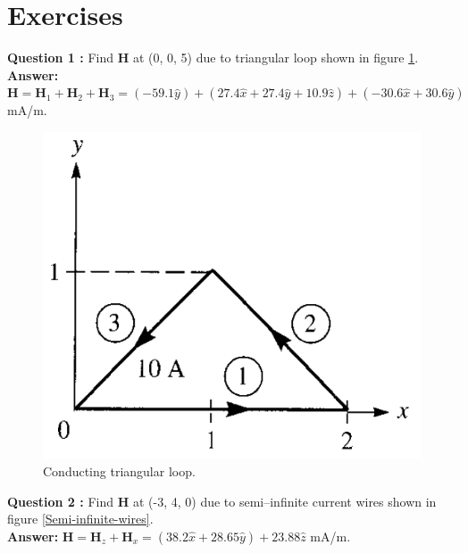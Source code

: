 \documentclass[12pt,a4paper]{article}
\begin{document}
\section{Exercises}
\noindent\textbf{Question 1 \cite[Example 7.1, page 266]{Sadiku}:} Find \textbf{H} at (0, 0, 5) due to triangular loop shown in figure \ref{Conducting-triangular-loop}.\\
\textbf{Answer: }$\textbf{H}=\textbf{H}_1+\textbf{H}_2+\textbf{H}_3=(-59.1\hat y)+(27.4\hat x+27.4\hat y+10.9\hat z)+(-30.6\hat x+30.6\hat y)$ mA/m.
\begin{figure}[H]
\centering
\includegraphics[scale=0.45]{Figure7-6aS.png}
\caption{Conducting triangular loop.}
\label{Conducting-triangular-loop}
\end{figure}
\noindent\textbf{Question 2 \cite[Example 7.1, page 266]{Sadiku}:} Find \textbf{H} at (-3, 4, 0) due to semi--infinite current wires shown in figure \ref{Semi-infinite-wires}.\\
\textbf{Answer: }$\textbf{H}=\textbf{H}_z+\textbf{H}_x=(38.2\hat x+28.65\hat y)+23.88\hat z$ mA/m.
\end{document}
